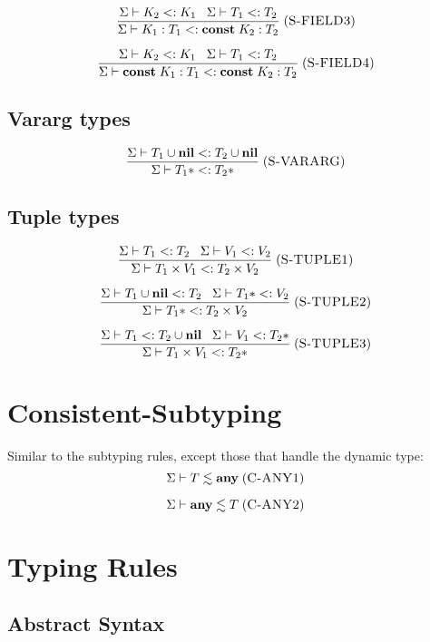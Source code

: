 \documentclass[12pt]{article}
\newcommand{\Any}{\mathbf{any}}
\newcommand{\Nil}{\mathbf{nil}}
\newcommand{\Const}{\mathbf{const}}
\newcommand{\mylabel}[1]{\; (\textsc{#1})}
\newcommand{\subtype}{<:}
\newcommand{\senv}{\Sigma}
\begin{document}
\[
\frac{\senv \vdash K_{2} \subtype K_{1} \;\;\;
      \senv \vdash T_{1} \subtype T_{2}}
     {\senv \vdash K_{1}:T_{1} \subtype \Const \; K_{2}:T_{2}}
\mylabel{S-FIELD3}
\]

\[
\frac{\senv \vdash K_{2} \subtype K_{1} \;\;\;
      \senv \vdash T_{1} \subtype T_{2}}
     {\senv \vdash \Const \; K_{1}:T_{1} \subtype \Const \; K_{2}:T_{2}}
\mylabel{S-FIELD4}
\]

\subsection{Vararg types}

\[
\frac{\senv \vdash T_{1} \cup \Nil \subtype T_{2} \cup \Nil}
     {\senv \vdash T_{1}* \subtype T_{2}*}
\mylabel{S-VARARG}
\]

\subsection{Tuple types}

\[
\frac{\senv \vdash T_{1} \subtype T_{2} \;\;\;
      \senv \vdash V_{1} \subtype V_{2}}
     {\senv \vdash T_{1} \times V_{1} \subtype T_{2} \times V_{2}}
\mylabel{S-TUPLE1}
\]

\[
\frac{\senv \vdash T_{1} \cup \Nil \subtype T_{2} \;\;\;
      \senv \vdash T_{1}* \subtype V_{2}}
     {\senv \vdash T_{1}* \subtype T_{2} \times V_{2}}
\mylabel{S-TUPLE2}
\]

\[
\frac{\senv \vdash T_{1} \subtype T_{2} \cup \Nil \;\;\;
      \senv \vdash V_{1} \subtype T_{2}*}
     {\senv \vdash T_{1} \times V_{1} \subtype T_{2}*}
\mylabel{S-TUPLE3}
\]

\section{Consistent-Subtyping}

Similar to the subtyping rules, except those that handle the dynamic type:
\[
\senv \vdash T \lesssim \Any
\mylabel{C-ANY1}
\]

\[
\senv \vdash \Any \lesssim T
\mylabel{C-ANY2}
\]

\section{Typing Rules}

\subsection{Abstract Syntax}
\end{document}
